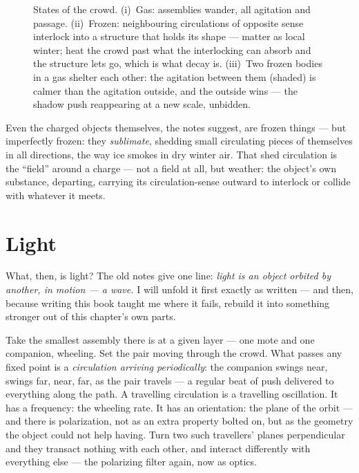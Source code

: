 \documentclass[fontsize=11pt,paper=a4,pagesize=auto,parskip=half-]{scrbook}
\begin{document}
\begin{figure}[htbp]
\caption{States of the crowd. (i)~Gas: assemblies wander, all agitation and passage. (ii)~Frozen: neighbouring circulations of opposite sense interlock into a structure that holds its shape --- matter as local winter; heat the crowd past what the interlocking can absorb and the structure lets go, which is what decay is. (iii)~Two frozen bodies in a gas shelter each other: the agitation between them (shaded) is calmer than the agitation outside, and the outside wins --- the shadow push reappearing at a new scale, unbidden.}
\label{fig:frozengas}
\end{figure}

Even the charged objects themselves, the notes suggest, are frozen things --- but imperfectly frozen: they \emph{sublimate}, shedding small circulating pieces of themselves in all directions, the way ice smokes in dry winter air. That shed circulation is the ``field'' around a charge --- not a field at all, but weather: the object's own substance, departing, carrying its circulation-sense outward to interlock or collide with whatever it meets.

\section{Light}

What, then, is light? The old notes give one line: \emph{light is an object orbited by another, in motion --- a wave.} I will unfold it first exactly as written --- and then, because writing this book taught me where it fails, rebuild it into something stronger out of this chapter's own parts.

Take the smallest assembly there is at a given layer --- one mote and one companion, wheeling. Set the pair moving through the crowd. What passes any fixed point is a \emph{circulation arriving periodically}: the companion swings near, swings far, near, far, as the pair travels --- a regular beat of push delivered to everything along the path. A travelling circulation is a travelling oscillation. It has a frequency: the wheeling rate. It has an orientation: the plane of the orbit --- and there is polarization, not as an extra property bolted on, but as the geometry the object could not help having. Turn two such travellers' planes perpendicular and they transact nothing with each other, and interact differently with everything else --- the polarizing filter again, now as optics.
\end{document}
